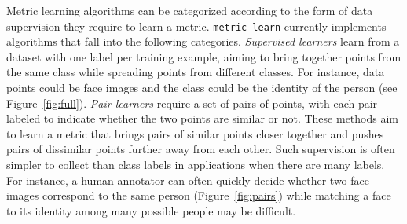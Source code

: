 \documentclass[twoside,11pt]{article}
\begin{document}
Metric learning algorithms can be categorized according to the form of data supervision they require to learn a metric.
\texttt{metric-learn} currently implements algorithms that fall into the following categories.
\emph{Supervised learners} learn from a dataset with one label per training example, aiming to bring together points from the same class while spreading points from different classes.
For instance, data points could be face images and the class could be the identity of the person (see Figure~\ref{fig:full}). 
\emph{Pair learners} require a set of pairs of points, with each pair labeled to indicate whether the two points are similar or not.
These methods aim to learn a metric that brings pairs of similar points closer together and pushes pairs of dissimilar points further away from each other.
Such supervision is often simpler to collect than class labels in applications when there are many labels. %
For instance, a human annotator can often quickly decide whether two face images correspond to the same person (Figure~\ref{fig:pairs}) while matching a face to its identity among many possible people may be difficult. 
\end{document}
